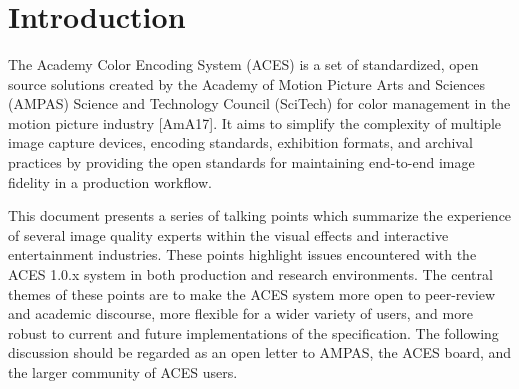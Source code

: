 \documentclass[conference]{IEEEtran}
\begin{document}
{\IEEEauthorblockN{}\\
\\
\IEEEauthorblockN{}\\
\\
\\
\\
\IEEEauthorblockN{}\\
\\
\\
\\
}

\maketitle

\IEEEpeerreviewmaketitle

\section{Introduction}
The Academy Color Encoding System (ACES) is a set of standardized, open source solutions created by the Academy of Motion Picture Arts and Sciences (AMPAS) Science and Technology Council (SciTech) for color management in the motion picture industry [AmA17]. It aims to simplify the complexity of multiple image capture devices, encoding standards, exhibition formats, and archival practices by providing the open standards for maintaining end-to-end image fidelity in a production workflow.

This document presents a series of talking points which summarize the experience of several image quality experts within the visual effects and interactive entertainment industries. These points highlight issues encountered with the ACES 1.0.x system in both production and research environments. The central themes of these points are to make the ACES system more open to peer-review and academic discourse, more flexible for a wider variety of users, and more robust to current and future implementations of the specification. The following discussion should be regarded as an open letter to AMPAS, the ACES board, and the larger community of ACES users.
\end{document}
